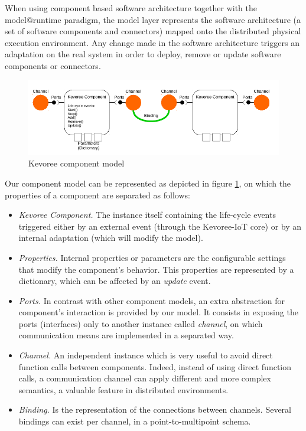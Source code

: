 When using component based software architecture together with the model@runtime paradigm, the model layer represents the software architecture (a set of software components and connectors) mapped onto the distributed physical execution environment.
Any change made in the software architecture triggers an adaptation on the real system in order to deploy, remove or update software components or connectors.   

\begin{figure}[htb]
	\centering
	\includegraphics[width=0.95\columnwidth]{chapters/calpulli.images/componentModel.pdf}
	\caption{Kevoree component model} \label{fig:kevCompModel}
\end{figure}

Our component model can be represented as depicted in figure \ref{fig:kevCompModel}, on which the properties of a component are separated as follows:
\begin{itemize}
	\item \textit{Kevoree Component.} The instance itself containing the life-cycle events triggered either by an external event (through the Kevoree-IoT core) or by an internal adaptation (which will modify the model).
	\item \textit{Properties.} Internal properties or parameters are the configurable settings that modify the component's behavior.
	This properties are represented by a dictionary, which can be affected by an \textit{update} event.
	\item \textit{Ports.} In contrast with other component models, an extra abstraction for component's interaction is provided by our model.
	It consists in exposing the ports (interfaces) only to another instance called \textit{channel}, on which communication means are implemented in a separated way.
	\item \textit{Channel.} An independent instance which is very useful to avoid direct function calls between components.
	Indeed, instead of using direct function calls, a communication channel can apply different and more complex semantics, a valuable feature in distributed environments\cite{fouquet2013kevoree, barais2005construire}.
	\item \textit{Binding.} Is the representation of the connections between channels. Several bindings can exist per channel, in a point-to-multipoint schema.
\end{itemize}

